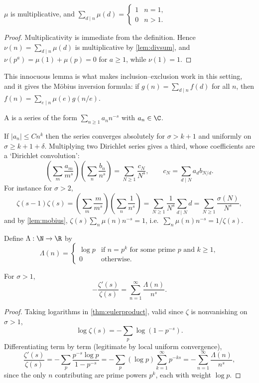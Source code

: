 \begin{lemma}\label{lem:mobius}
	$\mu$ is multiplicative, and $\displaystyle\sum_{d \mid n}\mu(d) = \begin{cases}1 & n = 1, \\ 0 & n > 1.\end{cases}$
\end{lemma}
\begin{proof}
	Multiplicativity is immediate from the definition. Hence $\nu(n) = \sum_{d\mid n}\mu(d)$ is multiplicative by \autoref{lem:divsum}, and $\nu(p^a) = \mu(1) + \mu(p) = 0$ for $a \geq 1$, while $\nu(1) = 1$.
\end{proof}

This innocuous lemma is what makes inclusion--exclusion work in this setting, and it gives the Möbius inversion formula: if $g(n) = \sum_{d \mid n}f(d)$ for all $n$, then $f(n) = \sum_{e \mid n}\mu(e)g(n/e)$.

\begin{definition}
	A  is a series of the form $\sum_{n \geq 1}a_n n^{-s}$ with $a_n \in \C$.
\end{definition}

If $|a_n| \leq Cn^k$ then the series converges absolutely for $\sigma > k+1$ and uniformly on $\sigma \geq k + 1 + \delta$. Multiplying two Dirichlet series gives a third, whose coefficients are a `Dirichlet convolution':
$$
\left(\sum_m \frac{a_m}{m^s}\right)\left(\sum_n\frac{b_n}{n^s}\right) = \sum_{N \geq 1}\frac{c_N}{N^s}, \qquad c_N = \sum_{d \mid N}a_d b_{N/d}.
$$
For instance for $\sigma > 2$,
$$
\zeta(s-1)\zeta(s) = \left(\sum_m \frac m{m^s}\right)\left(\sum_n\frac1{n^s}\right) = \sum_{N\geq1}\frac1{N^s}\sum_{d\mid N}d = \sum_{N\geq1}\frac{\sigma(N)}{N^s},
$$
and by \autoref{lem:mobius}, $\zeta(s)\sum_n \mu(n)n^{-s} = 1$, i.e.\ $\sum_n\mu(n)n^{-s} = 1/\zeta(s)$.

\begin{definition}
	Define $\Lambda : \N \to \R$ by
	$$
	\Lambda(n) = \begin{cases}\log p & \text{if } n = p^k \text{ for some prime } p \text{ and } k \geq 1, \\ 0 & \text{otherwise}.\end{cases}
	$$
\end{definition}

\begin{proposition}\label{prop:vonmangoldt}
	For $\sigma > 1$,
	$$
	-\frac{\zeta'(s)}{\zeta(s)} = \sum_{n=1}^\infty \frac{\Lambda(n)}{n^s}.
	$$
\end{proposition}
\begin{proof}
	Taking logarithms in \autoref{thm:eulerproduct}, valid since $\zeta$ is nonvanishing on $\sigma > 1$,
	$$
	\log\zeta(s) = -\sum_p \log\left(1 - p^{-s}\right).
	$$
	Differentiating term by term (legitimate by local uniform convergence),
	$$
	\frac{\zeta'(s)}{\zeta(s)} = -\sum_p \frac{p^{-s}\log p}{1 - p^{-s}} = -\sum_p (\log p)\sum_{k=1}^\infty p^{-ks} = -\sum_{n=1}^\infty \frac{\Lambda(n)}{n^s},
	$$
	since the only $n$ contributing are prime powers $p^k$, each with weight $\log p$.
\end{proof}


